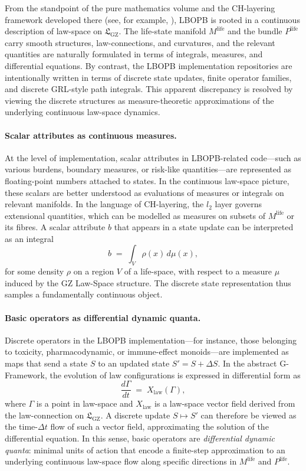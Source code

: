 \documentclass[11pt]{book}
\theoremstyle{plain}
\theoremstyle{definition}
\theoremstyle{remark}
\newcommand{\GZLS}{\ensuremath{\mathfrak{L}_{\mathrm{GZ}}}}       \newcommand{\GZLT}{\ensuremath{M_{!w}}}                           \newcommand{\GZLOC}{\ensuremath{A_M}}                             \newcommand{\GZLCurv}{\ensuremath{\mathcal{F}_{\mathrm{law}}}}
\begin{document}
From the standpoint of the pure mathematics volume and the CH-layering
framework developed there (see, for example,
\cite{GaoZheng2025GFramework}), LBOPB is rooted in a continuous
description of law-space on $\GZLS$. The life-state manifold
$M^{\mathrm{life}}$ and the bundle $P^{\mathrm{life}}$ carry smooth
structures, law-connections, and curvatures, and the relevant
quantities are naturally formulated in terms of integrals, measures,
and differential equations. By contrast, the LBOPB implementation
repositories are intentionally written in terms of discrete state
updates, finite operator families, and discrete GRL-style path
integrals. This apparent discrepancy is resolved by viewing the
discrete structures as measure-theoretic approximations of the
underlying continuous law-space dynamics.

\paragraph{Scalar attributes as continuous measures.}
At the level of implementation, scalar attributes in LBOPB-related
code---such as various burdens, boundary measures, or risk-like
quantities—are represented as floating-point numbers attached to
states. In the continuous law-space picture, these scalars are better
understood as evaluations of measures or integrals on relevant
manifolds. In the language of CH-layering, the $l_{2}$ layer governs
extensional quantities, which can be modelled as measures on subsets
of $M^{\mathrm{life}}$ or its fibres. A scalar attribute $b$ that
appears in a state update can be interpreted as an integral
\[
  b \;=\; \int_{V} \rho(x)\, d\mu(x),
\]
for some density $\rho$ on a region $V$ of a life-space, with respect
to a measure $\mu$ induced by the GZ Law-Space structure. The discrete
state representation thus samples a fundamentally continuous object.

\paragraph{Basic operators as differential dynamic quanta.}
Discrete operators in the LBOPB implementation---for instance, those
belonging to toxicity, pharmacodynamic, or immune-effect monoids—are
implemented as maps that send a state $S$ to an updated state
$S' = S + \Delta S$. In the abstract G-Framework, the evolution of law
configurations is expressed in differential form as
\[
  \frac{d\Gamma}{dt} \;=\; X_{\mathrm{law}}(\Gamma),
\]
where $\Gamma$ is a point in law-space and $X_{\mathrm{law}}$ is a
law-space vector field derived from the law-connection on
$\GZLS$. A discrete update $S \mapsto S'$ can therefore be viewed as
the time-$\Delta t$ flow of such a vector field, approximating the
solution of the differential equation. In this sense, basic operators
are \emph{differential dynamic quanta}: minimal units of action that
encode a finite-step approximation to an underlying continuous
law-space flow along specific directions in $M^{\mathrm{life}}$ and
$P^{\mathrm{life}}$.
\end{document}
